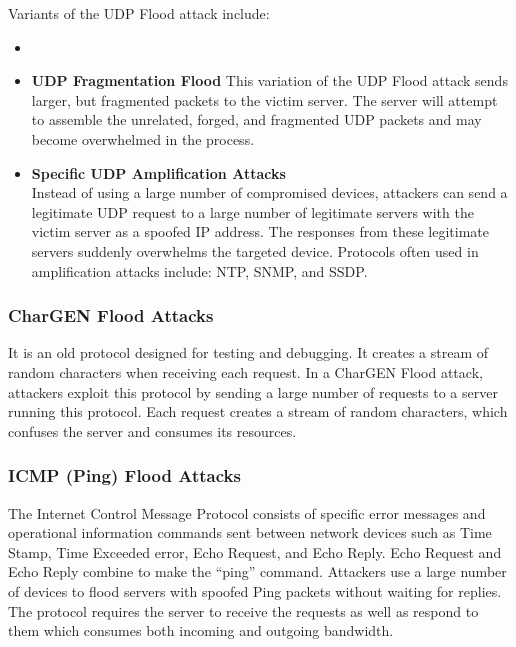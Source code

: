 \documentclass[a4paper, 12pt]{report} %
\begin{document}
\begin{table}[h!]
\begin{itemize}
        \end{itemize}

        Variants of the UDP Flood attack include:
        \begin{itemize}
            \item 
            \item \textbf{UDP Fragmentation Flood} This variation of the UDP Flood attack sends larger, but fragmented packets to the victim server. The server will attempt to assemble the unrelated, forged, and fragmented UDP packets and may become overwhelmed in the process.
            \item \textbf{Specific UDP Amplification Attacks} \\ Instead of using a large number of compromised devices, attackers can send a legitimate UDP request to a large number of legitimate servers with the victim server as a spoofed IP address. The responses from these legitimate servers suddenly overwhelms the targeted device. Protocols often used in amplification attacks include: NTP, SNMP, and SSDP.
            
        \end{itemize}


        \subsubsection{CharGEN Flood Attacks}
        It is an old protocol designed for testing and debugging. It creates a stream of random characters when receiving each request. In a CharGEN Flood attack, attackers exploit this protocol by sending a large number of requests to a server running this protocol. Each request creates a stream of random characters, which confuses the server and consumes its resources.

        \subsubsection{ICMP (Ping) Flood Attacks}
        The Internet Control Message Protocol consists of specific error messages and operational information commands sent between network devices such as Time Stamp, Time Exceeded error, Echo Request, and Echo Reply. Echo Request and Echo Reply combine to make the “ping” command.
        Attackers use a large number of devices to flood servers with spoofed Ping packets without waiting for replies. The protocol requires the server to receive the requests as well as respond to them which consumes both incoming and outgoing bandwidth.


\end{table}
\end{document}
